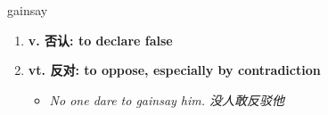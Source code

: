 
\begin{frame}
{\huge gainsay}
\begin{center}
\begin{enumerate}\Large
  \item \textbf{v. 否认: to declare false}
  \item \textbf{vt. 反对: to oppose, especially by contradiction}
  \begin{itemize}
    \item \em{\Large{No one dare to gainsay him. 没人敢反驳他}}
  \end{itemize}
\end{enumerate}
\end{center}
\end{frame}
